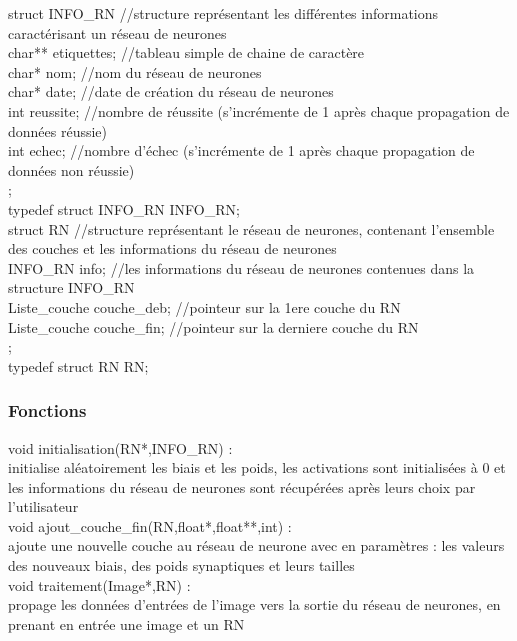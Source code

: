 \documentclass{article}
\begin{document}
			
			struct INFO_RN	//structure représentant les différentes informations caractérisant un réseau de neurones\\
			{
				char** etiquettes;	//tableau simple de chaine de caractère\\
				char* nom;	//nom du réseau de neurones\\
				char* date;	//date de création du réseau de neurones\\
				int reussite;	//nombre de réussite (s'incrémente de 1 après chaque propagation de données réussie)\\
				int echec;	//nombre d'échec (s'incrémente de 1 après chaque propagation de données non réussie)\\
			};\\
			typedef struct INFO_RN INFO_RN;\\
			
			struct RN	//structure représentant le réseau de neurones, contenant l'ensemble des couches et les informations du réseau de neurones\\
			{
				INFO_RN info;	//les informations du réseau de neurones contenues dans la structure INFO_RN\\
				Liste_couche couche_deb;	//pointeur sur la 1ere couche du RN\\
				Liste_couche couche_fin;    //pointeur sur la derniere couche du RN\\
			};\\
			typedef struct RN RN;\\
			
		\subsubsection{Fonctions}
			void initialisation(RN*,INFO_RN) :\\
				initialise aléatoirement les biais et les poids, les activations sont initialisées à 0 et les informations du réseau de neurones sont récupérées après leurs choix par l'utilisateur\\
			
			void ajout_couche_fin(RN,float*,float**,int) :\\
				ajoute une nouvelle couche au réseau de neurone avec en paramètres : les valeurs des nouveaux biais, des poids synaptiques et leurs tailles\\
			
			void traitement(Image*,RN) :\\
				propage les données d'entrées de l'image vers la sortie du réseau de neurones, en prenant en entrée une image et un RN\\
				
\end{document}
